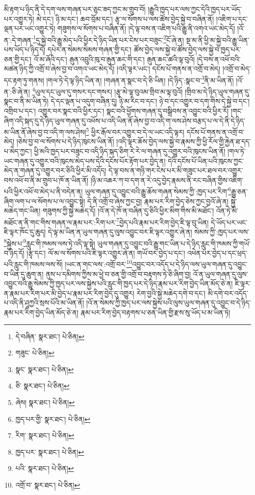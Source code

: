 མི་རྟག་པ་ཉིད་ནི་དེ་དག་ལས་གཞན་པར་ཅུང་ཟད་ཀྱང་མ་གྲུབ་བོ། །རྒྱུའི་ཁྱད་པར་ལས་ཀྱང་དེའི་ཁྱད་པར་ཡོད་པར་འགྱུར་ཏེ། མེ་དང་། ཉི་མ་དང་། ཆབ་བྲོམ་དང་། རྩྭ་ལ་སོགས་པ་ལས་ཚོས་བྱེད་སྐྱེ་བ་བཞིན་ནོ། །འཇིག་པ་དང་ལྡན་པར་ཡང་འགྱུར་ཏེ། གཟུགས་ལ་སོགས་པ་བཞིན་ནོ། །དེ་ལྟ་བས་ན་འཇིག་པའི་རྒྱུ་ནི་འགའ་ཡང་མེད་དོ། །འོ་ན་:དེ་གཞན་\footnote{དེ་བཞིན་  སྣར་ཐང་།  པེ་ཅིན། }དུ་སྐྱེ་བའི་རྒྱུ་མེད་པའི་ཕྱིར་དེ་ཉིད་ཡིན་པར་ངེས་པར་བཟུང་\footnote{གཟུང་  པེ་ཅིན། }ངོ་ཞེ་ན། སྔ་མ་ནི་ཕྱི་མ་སྐྱེ་བའི་རྒྱུ་ཡིན་པས་ཡོད་པ་ཉིད་དེ། དཔེར་ན་སེམས་སེམས་གཞན་གྱི་དང་། ཚོས་བྱེད་ལས་སྐྱེ་བ་ཚོས་བྱེད་ལས་སྐྱེ་བ་ཁྱད་པར་ཅན་གྱི་དང་། འོ་མ་ཞོའི་དང་། རྒུན་འབྲུའི་ཁུ་བ་རྒུན་ཆང་གི་དང་། རྒུན་ཆང་ཚའི་ལྟ་བུའོ། །དེ་བས་ན་འཕོ་བའི་མཚན་ཉིད་ཀྱི་འགྲོ་བ་ཞེས་བྱ་བ་འགའ་ཡང་མེད་དོ། །འདི་ལྟར་ཡང་། དངོས་པོ་གནས་ན་འགྲོ་བ་མེད། །འགྲོ་བ་མེད་དང་རྟག་ཏུ་གནས། །གལ་ཏེ་དེ་ལྟ་ཉིད་ཡིན་ན། །གཞན་ན་སྣང་བ་དེ་ཅི་ཡིན། །དེ་ཉིད་:སྣང་བ་\footnote{སྣང་  སྣར་ཐང་།  པེ་ཅིན། }ནི་མ་ཡིན་ནོ། །འོ་ན་:ཅི་ཞེ་ན། \footnote{ཅི་  སྣར་ཐང་།  པེ་ཅིན། }ཡུལ་དང་ཡུལ་དུ་གསར་དང་གསར། །རྩྭ་མེ་ལྟ་བུའམ་གྲིབ་མ་ལྟ་བུའོ། །གྲིབ་མ་དེ་ཉིད་ཡུལ་གཞན་དུ་སྣང་བ་ནི་མ་ཡིན་ཏེ། དེ་དང་ལྡན་པ་འདུག་བཞིན་དུ། ཉི་མ་རིང་བ་དང་། ཉེ་བ་དང་འགྱུར་བ་དག་གིས་དེ་སྐྱེ་བ་དང་། འགྲིབ་པ་དང་། འགྱུར་བར་སྣང་བའི་ཕྱིར་དང་། སྣང་བའི་ཕྱོགས་གཞན་དུ་བསྒྲིབས་ན་འབྱུང་བའི་ཕྱིར་རོ། །གང་ཞིག་འདི་སྐད་དུ་དེ་ཉིད་ཡུལ་གཞན་དུ་འཕོས་པ་འདི་ཡིན་ནོ་ཞེས་བྱ་བ་འདི་ག་ལས་ཤེས་བརྩད་པ་ལ་དེ་ནི་དེ་ཉིད་མ་ཡིན་ནོ་ཞེས་བྱ་བ་འདི་ག་ལས་ཤེས།\footnote{ཞེས།  སྣར་ཐང་།  པེ་ཅིན། } ཕྱིར་རྒོལ་བར་འགྱུར་བ་དེ་ལ་ཡང་འདི་ལྟར། དངོས་པོ་གནས་ན་འགྲོ་བ་མེད། །ཅེས་བྱ་བ་ལ་སོགས་པ་དེ་ཉིད་ཁུངས་ཡིན་ནོ། །འདི་ལྟར་ཆོས་བྱེད་ལས་སྐྱེ་བ་རྣམས་ཀྱི་ཕྱི་རོལ་གྱི་རྐྱེན་ཐ་དད་པ་མེད་ཀྱང་། ཕྱི་མའི་ཁྱད་པར་བཟུང་བ་འདི་ཉིད་སྐད་ཅིག་རེ་རེ་ལ་གཞན་དུ་འགྱུར་བའི་ཁུངས་ཡིན་ནོ། །གལ་ཏེ་ཡང་གཞན་དུ་འགྱུར་བའི་ཁུངས་མེད་པས་དེའི་དངོས་པོར་རྟོག་པར་བྱེད་ན། དེའི་དངོས་པོ་ཡིན་པའི་ཁུངས་ཀྱང་མེད་ན་གཞན་དུ་འགྱུར་བར་ཅིའི་ཕྱིར་མི་འདོད། དེ་ལྟ་བས་ན་གཉི་གར་ངེས་པར་མི་གཟུང་པར་ཐལ་བར་འགྱུར་བས་འཕོ་བ་ནི་མ་གྲུབ་པ་ཁོ་ན་ཡིན་ནོ། །ཉི་མ་འཆར་ཀ་བ་དག་ན་རེ་འདུ་བྱེད་རྣམས་ནི་རང་བཞིན་གྱིས་འཇིག་པའི་ཕྱིར་འཕོ་བ་མེད་པ་ནི་བདེན་ན། ཡུལ་གཞན་དུ་འབྱུང་བའི་རྒྱུ་ཆོས་གཞན་སེམས་ཀྱི་:ཁྱད་པར་རིག་\footnote{ཁྱད་པར་གྱི་  སྣར་ཐང་།  པེ་ཅིན། }རྒྱུ་ཅན་ཞིག་ལག་པ་ལ་སོགས་པ་ལ་འབྱུང་སྟེ། དེ་ནི་འགྲོ་བ་ཞེས་ཀྱང་བྱ། རྣམ་པར་རིག་བྱེད་ཅེས་ཀྱང་བྱའོ་ཞེ་ན། སྐྱེ་མཆེད་གང་ཡིན། གཟུགས་ཀྱི་སྐྱེ་མཆེད་དོ། །འོ་ན་དེ་ཁོ་ན་བཞིན་དུ་ཅིའི་ཕྱིར་མིག་གིས་མི་མཐོང་། འོན་ཏེ་མི་མཐོང་ན་ནི་གང་གིས་གཞན་ལ་རྣམ་པར་:རིག་པར་\footnote{རིག་  སྣར་ཐང་།  པེ་ཅིན། }བྱེད་པའི་རྣམ་པར་རིག་བྱེད་ཇི་ལྟ་བུ་ཡིན། དེ་ཡོད་པར་ཡང་ཇི་ལྟར་ཁོང་དུ་ཆུད། དེ་ལྟ་མ་ཡིན་ན་ཡུལ་གཞན་དུ་ལུས་འབྱུང་བར་ཇི་ལྟར་འགྱུར་ཞེ་ན། སེམས་ཀྱི་:ཁྱད་པར་ལས་\footnote{ཁྱད་པར་  སྣར་ཐང་།  པེ་ཅིན། }སྐྱེས་པ་\footnote{པའི་  སྣར་ཐང་།  པེ་ཅིན། }རླུང་གི་ཁམས་ལས་ཏེ་འདི་ལྟ་སྟེ། ཡུལ་གཞན་དུ་འབྱུང་བའི་རྒྱུ་གང་ཡིན་པ་དེ་ཉིད་རླུང་གི་ཁམས་ཀྱི་གཡོ་བ་ཉིད་དོ། །རྩྭ་དང་། ལོ་མ་ལ་སོགས་པའི་ཇི་ལྟར་འགྱུར་ཞེ་ན། གཡོ་བར་བྱེད་པ་དང་། འཕེན་པར་བྱེད་པ་དང་ཕྲད་པའི་རླུང་གི་ཁམས་ལས་སོ། །ཡང་ན་གང་ལས་:འགྲོ་བར་\footnote{འགྲོ་བ་  སྣར་ཐང་།  པེ་ཅིན། }འབྱུང་བར་འདོད་པ་དེ་ཉིད་ལས་ཡུལ་གཞན་དུ་འབྱུང་བ་ཡིན་དུ་ཆུག་ན། ནུས་པ་དམིགས་ཀྱིས་མ་ཕྱེ་བ་ཅན་གྱི་འགྲོ་བ་བརྟགས་ཏེ་ཅི་ཞིག་བྱ། འོ་ན་ཡུལ་གཞན་དུ་ལུས་འབྱུང་བའི་རྒྱུ་སེམས་ཀྱི་ཁྱད་པར་ལས་སྐྱེས་པའི་རླུང་གི་ཁྱད་པར་དེ་ཉིད་རྣམ་པར་རིག་བྱེད་ཡིན་མོད་ཅེ་ན། ཇི་ལྟར་ན་རྣམ་པར་རིག་པར་མི་བྱེད་པ་རྣམ་པར་རིག་བྱེད་དུ་འགྱུར། རེག་བྱའི་སྐྱེ་མཆེད་དགེ་བ་དང་། མི་དགེ་བར་འདོད་པ་འདི་ནི་ཤཱཀྱའི་སྲས་པོའི་མ་ཡིན་ནོ། །འོ་ན་སེམས་ཀྱི་ཁྱད་པར་ལས་སྐྱེས་པའི་ལུས་ཡུལ་གཞན་དུ་འབྱུང་བ་དེ་ཉིད་རྣམ་པར་རིག་བྱེད་ཡིན་མོད་ཅེ་ན། རྣམ་པར་རིག་བྱེད་བརྟགས་པ་ཅན་ཡིན་གྱི་རྫས་སུ་ཡོད་པ་མ་ཡིན་ཏེ། 